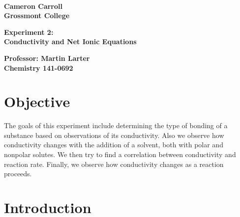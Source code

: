 \documentclass[fleqn,titlepage]{article}
\begin{document}
\begin{titlepage}
  \mbox{}\\[1.25cm]
  \textbf{\LARGE Cameron Carroll \\ Grossmont College}\\[2.25cm]
  \begin{center}
    \textbf{\huge Experiment 2: \\ Conductivity and Net Ionic Equations}\\[2.50cm]
  \end{center}
  \textbf{\LARGE Professor: Martin Larter \\ Chemistry 141-0692} \\
  \vfill
\end{titlepage}

\section*{Objective}
  \paragraph{} The goals of this experiment include determining the type of bonding of a substance based on observations of its conductivity. Also we observe how conductivity changes with the addition of a solvent, both with polar and nonpolar solutes. We then try to find a correlation between conductivity and reaction rate. Finally, we observe how conductivity changes as a reaction proceeds.


\section*{Introduction}
  \paragraph{} 

\newpage
\end{document}
